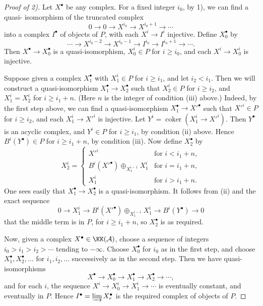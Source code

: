 \begin{proof}[Proof of 2)]
Let $X^\bullet$ be any complex. For a fixed integer $i_0$, by 1), we can find a quasi-
isomorphism of the truncated complex
\[
0\to 0\to X^{i_0}\to X^{i_0+1}\to\cdots
\]
 into a complex $I^\bullet$ of objects of $P$, with each $X^i\to I^i$ injective. Define $X_0^\bullet$ by
\[
\cdots\to X^{i_0-2}\to X^{i_0-1}\to I^{i_0}\to I^{i_0+1}\to\cdots.
\]
Then $X^\bullet\to X_0^\bullet$ is a quasi-isomorphism, $X_0^i\in P$ for $i\ge i_0$, and each $X^i\to X_0^i$ is injective.

Suppose given a complex $X_1^\bullet$ with $X_1^i\in P$ for $i\ge i_1$, and let $i_2<i_1$. Then we will construct a quasi-isomorphism $X_1^\bullet\to X_2^\bullet$ such that $X_2^i\in P$ for $i\ge i_2$, and $X_1^i=X_2^i$ for $i\ge i_1+n$. (Here $n$ is the integer of condition (iii) above.) Indeed, by the first step above, we can find a quasi-isomorphism $X_1^\bullet\to X'^\bullet$ such that $X'^i\in P$ for $i\ge i_2$, and each $X_1^i\to X'^i$ is injective. Let $Y^i=\operatorname{coker}(X_1^i\to X'^i)$. Then $Y^\bullet$ is an acyclic complex, and $Y^i\in P$ for $i\ge i_1$, by condition (ii) above. Hence $B^i(Y^\bullet)\in P$ for $i\ge i_1+n$, by condition (iii). Now define $X_2^\bullet$ by
\[
X_2^i=
\begin{cases}
X'^i & \text{for } i < i_1+n,\\[2pt]
B^i(X'^\bullet) \oplus_{X_1^{i-1}} X_1^i & \text{for } i = i_1+n,\\[2pt]
X_1^i & \text{for } i > i_1+n.
\end{cases}
\]
One sees easily that $X_1^\bullet\to X_2^\bullet$ is a quasi-isomorphism. It follows from (ii) and the exact sequence
\[
0 \longrightarrow X_1^i \longrightarrow B^i(X'^\bullet) \oplus_{X_1^{i-1}} X_1^i \longrightarrow B^i(Y^\bullet) \longrightarrow 0
\]
that the middle term is in $P$, for $i\ge i_1+n$, so $X_2^\bullet$ is as required.

Now, given a complex $X^\bullet\in\KK(\mathcal{A})$, choose a sequence of integers $i_0>i_1>i_2>\cdots$ tending to $-\infty$. Choose $X_0^\bullet$ for $i_0$ as in the first step, and choose $X_1^\bullet,X_2^\bullet,\dots$ for $i_1,i_2,\dots$ successively as in the second step. Then we have quasi-isomorphisms
\[
X^\bullet \longrightarrow X_0^\bullet \longrightarrow X_1^\bullet \longrightarrow X_2^\bullet \longrightarrow \cdots,
\]
and for each $i$, the sequence $X^i\to X_0^i\to X_1^i\to\cdots$ is eventually constant, and eventually in $P$. Hence $I^\bullet = \varinjlim X_r^\bullet$ is the required complex of objects of $P$.
\end{proof}

